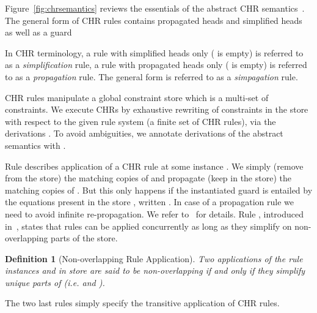 \documentclass{tlp}
\newtheorem{definition}{Definition}[section]
\begin{document}
Figure~\ref{fig:chrsemantics} reviews the essentials of the abstract CHR 
semantics~\cite{fruehwirth98:chr:art}. The general form of CHR rules contains propagated 
heads  and simplified heads  as well as a guard 

In CHR terminology, a rule with simplified heads only ( is empty) is referred to as
a {\em simplification} rule, a rule with propagated heads only ( is empty) is referred to as
a {\em propagation} rule. The general form is referred to as a {\em simpagation} rule.

CHR rules manipulate a global constraint store which is a multi-set of constraints.
We execute CHRs by exhaustive rewriting of constraints in the store
with respect to the given rule system (a finite set of CHR rules), via the derivations
. To avoid ambiguities, we annotate derivations  of the abstract 
semantics with .

Rule  describes application of a CHR rule  at some instance .
We simply (remove from the store)  the matching copies of  
and propagate (keep in the store) the matching copies of .
But this only happens if the instantiated guard  is entailed by the equations 
present in the store , written .
In case of a propagation rule we need to avoid infinite re-propagation. We refer 
to~\cite{abdennadher:confluence,greg:thesis} for details. 
Rule , introduced in~\cite{union-find}, states that rules can be 
applied concurrently as long as they 
simplify on non-overlapping parts of the store.
\begin{definition} 
   [Non-overlapping Rule Application] \label{def:nonoverlap-rule}
   Two applications of the rule instances
    and 
    in store  are said to 
   be non-overlapping if and only if they simplify unique parts of  
   (i.e.  and ).
\end{definition}
The two last  rules simply specify the transitive application of CHR rules.

\end{document}
